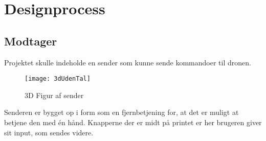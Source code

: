 \documentclass[Main]{subfiles}
\begin{document}
\section{Designprocess}

\subsection{Modtager}

Projektet skulle indeholde en sender som kunne sende kommandoer til dronen.

\begin{figure}[H]
\centering
\texttt{[image: 3dUdenTal]}
\caption{3D Figur af sender}
\label{Fig:3dUdenTal}
\end{figure}


Senderen er bygget op i form som en fjernbetjening for, at det er muligt at betjene den med én hånd.
Knapperne der er midt på printet er her brugeren giver sit input, som sendes videre.
\end{document}
